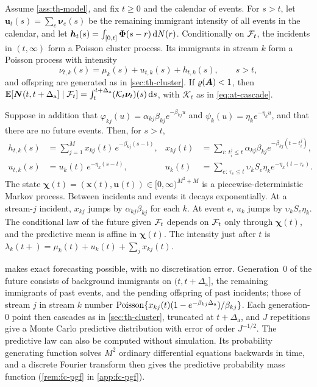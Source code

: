 \begin{lemma}\label{lem:fc-future}
Assume \cref{ass:th-model}, and fix $t\ge0$ and the calendar of events. For $s>t$, let
$\bm u_t(s)=\sum_e\bm\nu_e(s)$ be the remaining immigrant intensity of all events in the
calendar, and let $\bm h_t(s)=\int_{[0,t]}\bm{\Phi}(s-r)\,\mathrm{d}N(r)$. Conditionally on
$\mathcal{F}_t$, the incidents in $(t,\infty)$ form a Poisson cluster process. Its immigrants
in stream $k$ form a Poisson process with intensity
\[
\nu_{t,k}(s)=\mu_k(s)+u_{t,k}(s)+h_{t,k}(s),\qquad s>t,
\]
and offspring are generated as in \cref{sec:th-cluster}. If $\varrho(\bm{A})<1$, then
$\mathbb{E}[\bm N(t,t+\Delta_{\mathrm a}]\mid\mathcal{F}_t]=\int_t^{t+\Delta_{\mathrm a}}(\mathcal K_t\bm\nu_t)(s)\,\mathrm{d} s$,
with $\mathcal K_t$ as in \eqref{eq:at-cascade}.

Suppose in addition that $\varphi_{kj}(u)=\alpha_{kj}\beta_{kj}e^{-\beta_{kj}u}$ and
$\psi_k(u)=\eta_ke^{-\eta_ku}$, and that there are no future events. Then, for $s>t$,
\begin{equation}\label{eq:fc-state}
\begin{aligned}
  h_{t,k}(s)&=\sum_{j=1}^{M}x_{kj}(t)\,e^{-\beta_{kj}(s-t)}, &
  x_{kj}(t)&=\sum_{i:\,t^j_i\le t}\alpha_{kj}\beta_{kj}e^{-\beta_{kj}(t-t^j_i)},\\
  u_{t,k}(s)&=u_k(t)\,e^{-\eta_k(s-t)}, &
  u_k(t)&=\sum_{e:\,\tau_e\le t}\upsilon_kS_e\eta_ke^{-\eta_k(t-\tau_e)} .
\end{aligned}
\end{equation}
The state $\bm\chi(t)=(\bm x(t),\bm u(t))\in[0,\infty)^{M^2+M}$ is a piecewise-deterministic
Markov process. Between incidents and events it decays exponentially. At a stream-$j$
incident, $x_{kj}$ jumps by $\alpha_{kj}\beta_{kj}$ for each $k$. At event $e$, $u_k$
jumps by $\upsilon_kS_e\eta_k$. The conditional law of the future given $\mathcal{F}_t$ depends on
$\mathcal{F}_t$ only through $\bm\chi(t)$, and the predictive mean is affine in $\bm\chi(t)$.
The intensity just after $t$ is
$\lambda_k(t+)=\mu_k(t)+u_k(t)+\sum_jx_{kj}(t)$.
\end{lemma}

 makes exact forecasting possible, with no discretisation error.
Generation~0 of the future consists of background immigrants on
$(t,t+\Delta_{\mathrm a}]$, the remaining immigrants of past events, and the pending
offspring of past incidents; those of stream $j$ in stream $k$ number
$\operatorname{Poisson}\{x_{kj}(t)(1-e^{-\beta_{kj}\Delta_{\mathrm a}})/\beta_{kj}\}$. Each generation-0 point
then cascades as in \cref{sec:th-cluster}, truncated at $t+\Delta_{\mathrm a}$, and $J$
repetitions give a Monte Carlo predictive distribution with error of order $J^{-1/2}$.
The predictive law can also be computed without simulation. Its probability generating
function solves $M^2$ ordinary differential equations backwards in time, and a discrete
Fourier transform then gives the predictive probability mass function
(\cref{rem:fc-pgf} in \cref{app:fc-pgf}).

